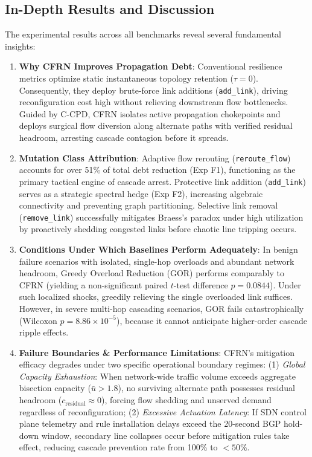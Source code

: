 \documentclass[pdflatex,sn-mathphys-num]{sn-jnl}
\theoremstyle{thmstyleone}
\theoremstyle{thmstyletwo}
\theoremstyle{thmstylethree}
\begin{document}
\subsection{In-Depth Results and Discussion}\label{sec7.8}
The experimental results across all benchmarks reveal several fundamental insights:
\begin{enumerate}
    \item \textbf{Why CFRN Improves Propagation Debt}: Conventional resilience metrics optimize static instantaneous topology retention ($\tau=0$). Consequently, they deploy brute-force link additions (\texttt{add\_link}), driving reconfiguration cost high without relieving downstream flow bottlenecks. Guided by C-CPD, CFRN isolates active propagation chokepoints and deploys surgical flow diversion along alternate paths with verified residual headroom, arresting cascade contagion before it spreads.
    \item \textbf{Mutation Class Attribution}: Adaptive flow rerouting (\texttt{reroute\_flow}) accounts for over 51\% of total debt reduction (Exp F1), functioning as the primary tactical engine of cascade arrest. Protective link addition (\texttt{add\_link}) serves as a strategic spectral hedge (Exp F2), increasing algebraic connectivity and preventing graph partitioning. Selective link removal (\texttt{remove\_link}) successfully mitigates Braess's paradox under high utilization by proactively shedding congested links before chaotic line tripping occurs.
    \item \textbf{Conditions Under Which Baselines Perform Adequately}: In benign failure scenarios with isolated, single-hop overloads and abundant network headroom, Greedy Overload Reduction (GOR) performs comparably to CFRN (yielding a non-significant paired $t$-test difference $p = 0.0844$). Under such localized shocks, greedily relieving the single overloaded link suffices. However, in severe multi-hop cascading scenarios, GOR fails catastrophically ($\text{Wilcoxon } p = 8.86 \times 10^{-5}$), because it cannot anticipate higher-order cascade ripple effects.
    \item \textbf{Failure Boundaries \& Performance Limitations}: CFRN's mitigation efficacy degrades under two specific operational boundary regimes: (1) \textit{Global Capacity Exhaustion}: When network-wide traffic volume exceeds aggregate bisection capacity ($\bar{u} > 1.8$), no surviving alternate path possesses residual headroom ($c_{\mathrm{residual}} \approx 0$), forcing flow shedding and unserved demand regardless of reconfiguration; (2) \textit{Excessive Actuation Latency}: If SDN control plane telemetry and rule installation delays exceed the 20-second BGP hold-down window, secondary line collapses occur before mitigation rules take effect, reducing cascade prevention rate from 100\% to $<50\%$.
\end{enumerate}
\end{document}
